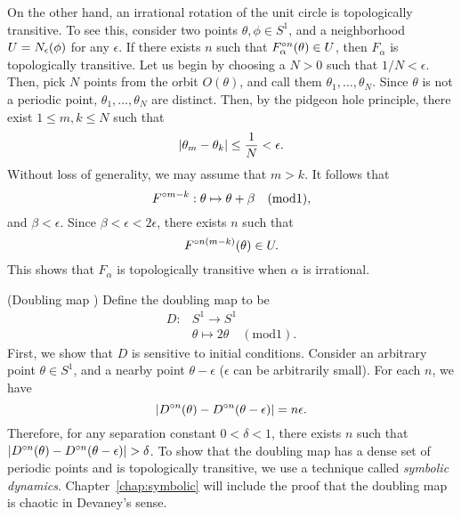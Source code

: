 \documentclass[12pt,draft,twoside]{book}
\begin{document}
\begin{example}
On the other hand, an irrational rotation of the unit circle is topologically transitive.
To see this, consider two points $\theta, \phi \in S^1$, and a neighborhood $U = N_{\epsilon}(\phi)$ for any $\epsilon$.
If there exists $n$ such that $F_\alpha^{\circ n}(\theta) \in U$, then $F_\alpha$ is topologically transitive.
Let us begin by choosing a $N > 0$ such that $1/N < \epsilon$.
Then, pick $N$ points from the orbit $O(\theta)$, and call them $\theta_1, \ldots, \theta_N$.
Since $\theta$ is not a periodic point, $\theta_1, \ldots, \theta_N$ are distinct.
Then, by the pidgeon hole principle, there exist $1 \leq m,k \leq N$ such that
\begin{equation*}
  \left |  \theta_m - \theta_k  \right | \leq \frac{1}{N} < \epsilon.
\end{equation*}
Without loss of generality, we may assume that $m > k$.
It follows that 
\begin{equation*}
  F^{\circ m - k}: \theta \mapsto \theta + \beta \quad(\mathrm{mod} 1),
\end{equation*}
and $\beta < \epsilon$.
Since $\beta < \epsilon < 2\epsilon$, there exists $n$ such that
\begin{equation*}
  F^{\circ n(m-k)}(\theta) \in U.
\end{equation*}
This shows that $F_\alpha$ is topologically transitive when $\alpha$ is irrational.
\end{example}
\begin{example}
  (Doubling map \citep{devaney})
  Define the doubling map to be 
  \begin{align*}
    D: &S^1 \to S^1  \\
    &\theta \mapsto 2\theta \quad(\mathrm{mod} 1).
  \end{align*}
  First, we show that $D$ is sensitive to initial conditions. 
  Consider an arbitrary point $\theta \in S^1$, and a nearby point $\theta - \epsilon$ ($\epsilon$ can be arbitrarily small).
  For each $n$, we have
  \begin{equation*}
    \left |  D^{\circ n}(\theta) - D^{\circ n}(\theta - \epsilon)  \right | 
    = 
    n\epsilon.
  \end{equation*}
  Therefore, for any separation constant $0 < \delta < 1$, there exists $n$ such that $\left |  D^{\circ n}(\theta) - D^{\circ n}(\theta - \epsilon)  \right | > \delta$.
  To show that the doubling map has a dense set of periodic points and is topologically transitive, we use a technique called \textit{symbolic dynamics}.
  Chapter~\ref{chap:symbolic} will include the proof that the doubling map is chaotic in Devaney's sense.
\end{example}
\end{document}
